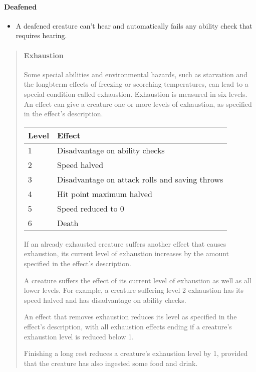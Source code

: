 \documentclass[
]{article}
\providecommand{\tightlist}{%
  \setlength{\itemsep}{0pt}\setlength{\parskip}{0pt}}
\begin{document}
\hypertarget{deafened}{%
\paragraph{Deafened}\label{deafened}}

\begin{itemize}
\tightlist
\item
  A deafened creature can't hear and automatically fails any ability
  check that requires hearing.
\end{itemize}

\begin{quote}
\mbox{}%
\hypertarget{exhaustion}{%
\paragraph{Exhaustion}\label{exhaustion}}

Some special abilities and environmental hazards, such as starvation and
the longbterm effects of freezing or scorching temperatures, can lead to
a special condition called exhaustion. Exhaustion is measured in six
levels. An effect can give a creature one or more levels of exhaustion,
as specified in the effect's description.

\begin{longtable}[]{@{}ll@{}}
\toprule
Level & Effect\tabularnewline
\midrule
\endhead
1 & Disadvantage on ability checks\tabularnewline
2 & Speed halved\tabularnewline
3 & Disadvantage on attack rolls and saving throws\tabularnewline
4 & Hit point maximum halved\tabularnewline
5 & Speed reduced to 0\tabularnewline
6 & Death\tabularnewline
\bottomrule
\end{longtable}

If an already exhausted creature suffers another effect that causes
exhaustion, its current level of exhaustion increases by the amount
specified in the effect's description.

A creature suffers the effect of its current level of exhaustion as well
as all lower levels. For example, a creature suffering level 2
exhaustion has its speed halved and has disadvantage on ability checks.

An effect that removes exhaustion reduces its level as specified in the
effect's description, with all exhaustion effects ending if a creature's
exhaustion level is reduced below 1.

Finishing a long rest reduces a creature's exhaustion level by 1,
provided that the creature has also ingested some food and drink.
\end{quote}
\end{document}
